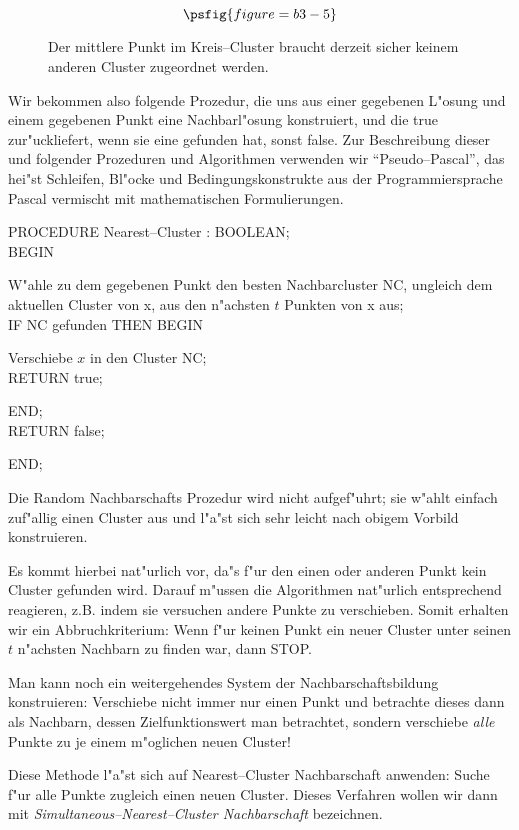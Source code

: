 \begin{figure}[htbp]
\[ \psfig{figure=b3-5} \]
\caption{Der mittlere Punkt im Kreis--Cluster braucht derzeit sicher keinem
anderen Cluster zugeordnet werden. \label{b3-5}}
\end{figure}

Wir bekommen also folgende Prozedur, die uns aus einer gegebenen L"osung
und einem gegebenen Punkt eine Nachbarl"osung konstruiert,  und die true
zur"uckliefert, wenn sie eine gefunden hat, sonst false.
Zur Beschreibung dieser und folgender Prozeduren und Algorithmen 
verwenden wir "`Pseudo--Pascal"', 
das hei"st Schleifen, Bl"ocke und Bedingungskonstrukte aus 
der Programmiersprache {\sc Pascal} vermischt mit
mathematischen Formulierungen.

\begin{algorithm*}
PROCEDURE Nearest--Cluster : BOOLEAN;\\
BEGIN
\begin{Block}
	W"ahle zu dem gegebenen Punkt den besten Nachbarcluster NC, ungleich dem 
	aktuellen Cluster von x, aus den n"achsten $t$ Punkten von x aus;\\
	IF NC gefunden THEN BEGIN
	\begin{Block}
		Verschiebe $x$ in den Cluster NC;\\
		RETURN true;
	\end{Block}
	END;\\
	RETURN false;
\end{Block}
END;
\end{algorithm*}


Die  Random Nachbarschafts Prozedur wird nicht aufgef"uhrt;
sie w"ahlt einfach zuf"allig einen Cluster aus und
l"a"st sich sehr leicht nach obigem Vorbild konstruieren.

Es kommt hierbei nat"urlich vor, da"s f"ur den einen oder anderen Punkt
kein Cluster gefunden wird. Darauf m"ussen die Algorithmen nat"urlich
entsprechend reagieren, z.B. indem sie versuchen andere Punkte zu 
verschieben. Somit erhalten wir ein Abbruchkriterium: Wenn f"ur keinen
Punkt ein neuer Cluster unter seinen $t$ n"achsten Nachbarn zu
finden war, dann STOP.

Man kann noch ein weitergehendes System der Nachbarschaftsbildung 
konstruieren: Verschiebe nicht immer nur einen Punkt und betrachte dieses
dann als Nachbarn, dessen Zielfunktionswert man betrachtet, 
sondern verschiebe {\it alle} Punkte zu je einem m"oglichen neuen Cluster!

Diese Methode l"a"st sich auf Nearest--Cluster Nachbarschaft
anwenden: Suche f"ur alle Punkte zugleich einen neuen Cluster.
Dieses Verfahren wollen wir dann mit 
{\em Simultaneous--Nearest--Cluster Nachbarschaft} bezeichnen.

